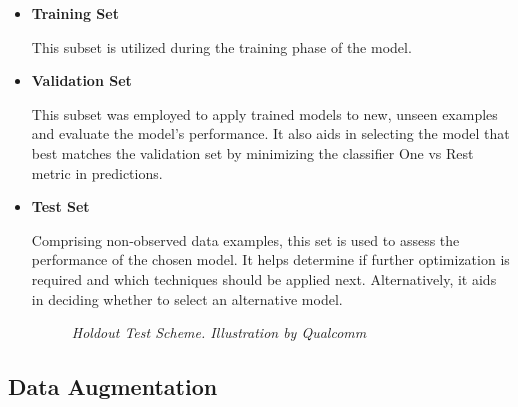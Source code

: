 \begin{itemize}

  \item \textbf{Training Set}

This subset is utilized during the training phase of the model.

\item \textbf{Validation Set}

This subset was employed to apply trained models to new, unseen examples and evaluate the model's performance. It also aids in selecting the model that best matches the validation set by minimizing the classifier One vs Rest metric in predictions.

\item \textbf{Test Set}

Comprising non-observed data examples, this set is used to assess the performance of the chosen model. It helps determine if further optimization is required and which techniques should be applied next. Alternatively, it aids in deciding whether to select an alternative model.


\begin{figure}[H]
\centering
{}
\caption[Holdout Test Scheme]{\textit{Holdout Test Scheme. Illustration by Qualcomm}}
{\label{fig:holdout-test-scheme}}
\end{figure}

\end{itemize}

\newpage

\subsection{Data Augmentation}

